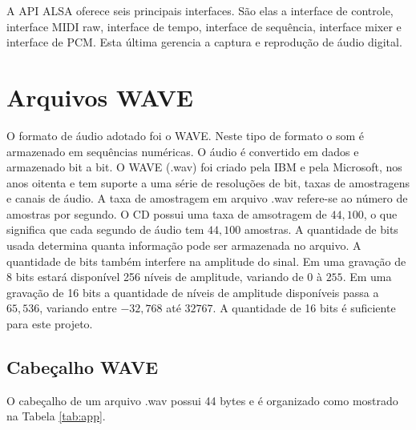 \quad A API ALSA oferece seis principais interfaces. São elas  a interface de controle, interface MIDI raw, interface de tempo, interface de sequência, interface mixer e interface de PCM. Esta última gerencia a captura e reprodução de áudio digital. 


\section{Arquivos WAVE}

\quad O formato de áudio adotado foi o WAVE. Neste tipo de formato o som é armazenado em sequências numéricas. O áudio é convertido em dados e armazenado bit a bit. O WAVE (.wav) foi criado pela IBM e pela Microsoft, nos anos oitenta e tem suporte a  uma série de resoluções de bit, taxas de amostragens e canais de áudio.  A taxa de amostragem em arquivo .wav refere-se ao número de amostras por segundo. O CD possui uma taxa de amsotragem de $44,100$, o que significa que cada segundo de áudio tem $44,100$ amostras. A quantidade de bits usada determina  quanta informação pode ser armazenada  no arquivo. A quantidade de bits também interfere na amplitude do sinal. Em uma gravação de 8 bits estará disponível 256 níveis de amplitude, variando de $0$ à $255$. Em uma gravação de 16 bits a quantidade de níveis de amplitude disponíveis passa a $65,536$, variando entre $-32,768$  até $32767$. A quantidade de 16 bits é suficiente para este projeto. 

\subsection{Cabeçalho WAVE}

\quad O cabeçalho de um arquivo .wav possui 44 bytes e é organizado como mostrado na Tabela \ref{tab:app}.

